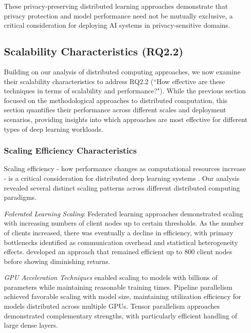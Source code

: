 \documentclass[acmsmall]{acmart}
\begin{document}
These privacy-preserving distributed learning approaches demonstrate that privacy protection and model performance need not be mutually exclusive, a critical consideration for deploying AI systems in privacy-sensitive domains.

\subsection{Scalability Characteristics (RQ2.2)}\label{subsec:scalability-characteristics-rq22}
Building on our analysis of distributed computing approaches, we now examine their scalability characteristics to address RQ2.2 (``How effective are these techniques in terms of scalability and performance?"). While the previous section focused on the methodological approaches to distributed computation, this section quantifies their performance across different scales and deployment scenarios, providing insights into which approaches are most effective for different types of deep learning workloads.

\subsubsection{Scaling Efficiency Characteristics}\label{subsubsec:scalability-characteristics-rq22:scaling-efficiency-characteristics}
Scaling efficiency - how performance changes as computational resources increase - is a critical consideration for distributed deep learning systems \citep{Zhang20229876}. Our analysis revealed several distinct scaling patterns across different distributed computing paradigms.

\textit{Federated Learning Scaling}: Federated learning approaches demonstrated scaling with increasing numbers of client nodes up to certain thresholds. As the number of clients increased, there was eventually a decline in efficiency, with primary bottlenecks identified as communication overhead and statistical heterogeneity effects. \citet{Zhang20229876} developed an approach that remained efficient up to 800 client nodes before showing diminishing returns.

\textit{GPU Acceleration Techniques} enabled scaling to models with billions of parameters while maintaining reasonable training times. Pipeline parallelism achieved favorable scaling with model size, maintaining utilization efficiency for models distributed across multiple GPUs. Tensor parallelism approaches demonstrated complementary strengths, with particularly efficient handling of large dense layers.
\end{document}
